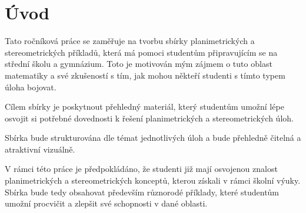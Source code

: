 \chapter*{Úvod}

Tato ročníková práce se zaměřuje na tvorbu sbírky planimetrických a stereometrických příkladů, která má pomoci studentům připravujícím se na střední školu a gymnázium. Toto je motivován mým zájmem o tuto oblast matematiky a své zkušeností s tím, jak mohou někteří studenti s tímto typem úloha bojovat.

Cílem sbírky je poskytnout přehledný materiál, který studentům umožní lépe osvojit si potřebné dovednosti k řešení planimetrických a stereometrických úloh.

Sbírka bude strukturována dle témat jednotlivých úloh a bude přehledně čitelná a atraktivní vizuálně.

V rámci této práce je předpokládáno, že studenti již mají osvojenou znalost planimetrických a stereometrických konceptů, kterou získali v rámci školní výuky. Sbírka bude tedy obsahovat především různorodé příklady, které studentům umožní procvičit a zlepšit své schopnosti v dané oblasti.
